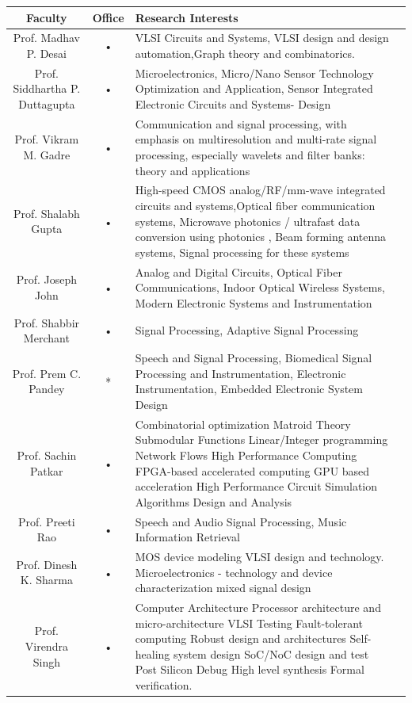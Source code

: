 \documentclass[11pt,fleqn,openany]{book} %
\begin{document}
\begin{tabular}{|c|c|p{6cm}|c}
\hline 
Faculty  & Office  & Research Interests \\ 
\hline
Prof. Madhav P. Desai & • & VLSI Circuits and Systems, VLSI design and design automation,Graph theory and combinatorics.\\ 
\hline 
Prof. Siddhartha P. Duttagupta & • & Microelectronics, Micro/Nano Sensor Technology Optimization and Application, Sensor Integrated Electronic Circuits and Systems- Design \\ 
\hline 
Prof. Vikram M. Gadre & • & Communication and signal processing, with emphasis on multiresolution and multi-rate signal processing, especially wavelets and filter banks: theory and applications \\ 
\hline 
Prof. Shalabh Gupta & • & High-speed CMOS analog/RF/mm-wave integrated circuits and systems,Optical fiber communication systems, Microwave photonics / ultrafast data  conversion using photonics , Beam forming antenna systems, Signal processing for these systems \\ 
\hline 
Prof. Joseph John & • & Analog and Digital Circuits, Optical Fiber Communications, Indoor Optical Wireless Systems, Modern Electronic Systems and Instrumentation \\ 
\hline 
Prof. Shabbir Merchant & • & Signal Processing, Adaptive Signal Processing\\ 
\hline 
Prof. Prem C. Pandey & *  &  Speech and Signal Processing, Biomedical Signal Processing and Instrumentation, Electronic Instrumentation, Embedded Electronic System Design\\ 
\hline 
Prof. Sachin Patkar & • & Combinatorial optimization Matroid Theory Submodular Functions
Linear/Integer programming Network Flows High Performance Computing FPGA-based accelerated computing GPU based acceleration High Performance Circuit Simulation Algorithms Design and Analysis \\ 
 \hline 
 Prof. Preeti Rao & • &  Speech and Audio Signal Processing, Music Information Retrieval \\ 
 \hline 
 Prof. Dinesh K. Sharma & • & MOS device modeling VLSI design and technology. Microelectronics - technology and device characterization mixed signal design \\ 
 \hline 
 Prof. Virendra Singh & • & Computer Architecture Processor architecture and micro-architecture
VLSI Testing Fault-tolerant computing Robust design and architectures Self-healing system design SoC/NoC design and test Post Silicon Debug High level synthesis Formal verification. \\ 

\end{tabular}
\end{document}
